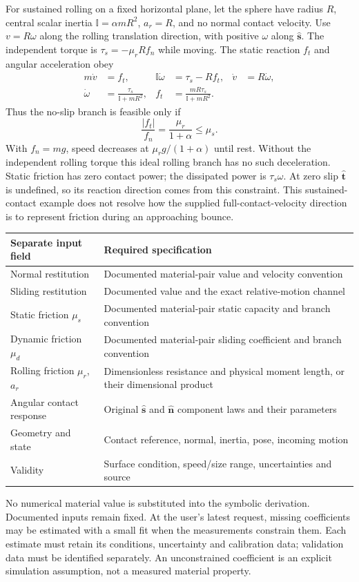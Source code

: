\documentclass[11pt,a4paper]{article}
\newcommand{\inertia}{\mathbb I}
\begin{document}
For sustained rolling on a fixed horizontal plane, let the sphere have radius $R$, central scalar inertia $\inertia=\alpha mR^2$, $a_r=R$, and no normal contact velocity. Use $v=R\omega$ along the rolling translation direction, with positive $\omega$ along $\hat{\mathbf s}$. The independent torque is $\tau_s=-\mu_r R f_n$ while moving. The static reaction $f_t$ and angular acceleration obey
\begin{align}
 m\dot v&=f_t,&\inertia\dot\omega&=\tau_s-Rf_t,&\dot v&=R\dot\omega,\\
 \dot\omega&=\frac{\tau_s}{\inertia+mR^2},&
 f_t&=\frac{mR\tau_s}{\inertia+mR^2}.&&
\end{align}
Thus the no-slip branch is feasible only if
\begin{equation}
 \frac{|f_t|}{f_n}=\frac{\mu_r}{1+\alpha}\le\mu_s.
\end{equation}
With $f_n=mg$, speed decreases at $\mu_r g/(1+\alpha)$ until rest. Without the independent rolling torque this ideal rolling branch has no such deceleration. Static friction has zero contact power; the dissipated power is $\tau_s\omega$. At zero slip $\hat{\mathbf t}$ is undefined, so its reaction direction comes from this constraint. This sustained-contact example does not resolve how the supplied full-contact-velocity direction is to represent friction during an approaching bounce.

\begin{center}\small
\begin{tabular}{p{40mm}p{93mm}}\hline
Separate input field & Required specification\\\hline
Normal restitution & Documented material-pair value and velocity convention\\
Sliding restitution & Documented value and the exact relative-motion channel\\
Static friction $\mu_s$ & Documented material-pair static capacity and branch convention\\
Dynamic friction $\mu_d$ & Documented material-pair sliding coefficient and branch convention\\
Rolling friction $\mu_r$, $a_r$ & Dimensionless resistance and physical moment length, or their dimensional product\\
Angular contact response & Original $\hat{\mathbf{s}}$ and $\hat{\mathbf{n}}$ component laws and their parameters\\
Geometry and state & Contact reference, normal, inertia, pose, incoming motion\\
Validity & Surface condition, speed/size range, uncertainties and source\\\hline
\end{tabular}\end{center}
No numerical material value is substituted into the symbolic derivation. Documented inputs remain fixed. At the user's latest request, missing coefficients may be estimated with a small fit when the measurements constrain them. Each estimate must retain its conditions, uncertainty and calibration data; validation data must be identified separately. An unconstrained coefficient is an explicit simulation assumption, not a measured material property.
\end{document}
